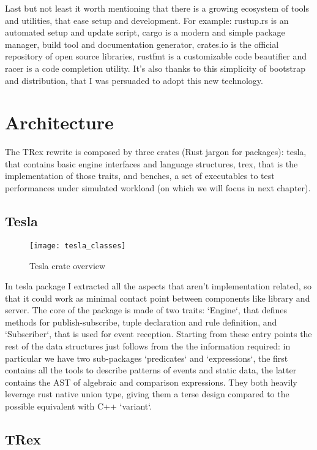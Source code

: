 Last but not least it worth mentioning that there is a growing ecosystem of tools and utilities, that ease setup and development. For example: rustup.rs is an automated setup and update script, cargo is a modern and simple package manager, build tool and documentation generator, crates.io is the official repository of open source libraries, rustfmt is a customizable code beautifier and racer is a code completion utility. It's also thanks to this simplicity of bootstrap and distribution, that I was persuaded to adopt this new technology.

\section{Architecture}
The TRex rewrite is composed by three crates (Rust jargon for packages): tesla, that contains basic engine interfaces and language structures, trex, that is the implementation of those traits, and benches,  a set of executables to test performances under simulated workload (on which we will focus in next chapter).

\subsection{Tesla}

\begin{figure}[h]
  \centering
  \texttt{[image: tesla\_classes]}
  \caption{Tesla crate overview}
\end{figure}

In tesla package I extracted all the aspects that aren't implementation related, so that it could work as minimal contact point between components like library and server. The core of the package is made of two traits: `Engine`, that defines methods for publish-subscribe, tuple declaration and rule definition, and `Subscriber`, that is used for event reception. Starting from these entry points the rest of the data structures just follows from the the information required: in particular we have two sub-packages `predicates` and `expressions`, the first contains all the tools to describe patterns of events and static data, the latter contains the AST of algebraic and comparison expressions. They both heavily leverage rust native union type, giving them a terse design compared to the possible equivalent with C++ `variant`.

\subsection{TRex}

